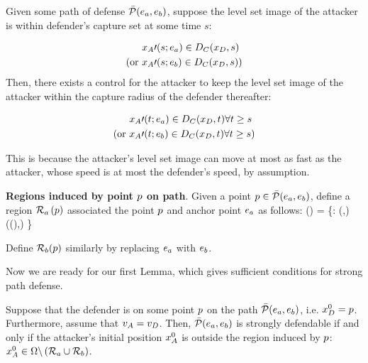 \begin{rem}
Given some path of defense $\bar{\mathcal{P}}(e_a,e_b)$, suppose the level set image of the attacker is within defender's capture set at some time $s$: 

\begin{equation*}
\begin{aligned}
&x_A\prime(s;e_a) \in D_C(x_D, s) \\
\text{(or } & x_A\prime(s;e_b) \in D_C(x_D, s) \text{)}
\end{aligned}
\end{equation*}
Then, there exists a control for the attacker to keep the level set image of the attacker within the capture radius of the defender thereafter: 

\begin{equation*}
\begin{aligned}
&x_A\prime(t;e_a) \in D_C(x_D, t) \forall t\geq s\\
\text{(or } & x_A\prime(t;e_b) \in D_C(x_D, t) \forall t\geq s\text{)}
\end{aligned}
\end{equation*}

This is because the attacker's level set image can move at most as fast as the attacker, whose speed is at most the defender's speed, by assumption.
\end{rem}

\begin{defn} %
\label{def:d_win_region}
\textbf{Regions induced by point $p$ on path}. Given a point $p\in\bar{\mathcal{P}}(e_a,e_b)$, define a region $\mathcal{R}_a\left(p\right)$ associated the point $p$ and anchor point $e_a$ as follows:
\bq
\rpa\left(\ppath\right) = \left\{\x: \dist(\x,\apa) \leq \dist(\Dc(\ppath),\apa) \right\}
\eq

Define $\mathcal{R}_b(p)$ similarly by replacing $e_a$ with $e_b$.
\end{defn}

Now we are ready for our first Lemma, which gives sufficient conditions for strong path defense.
\begin{lem}
\label{lem:d_winning_region}
Suppose that the defender is on some point $p$ on the path $\bar{\mathcal{P}}(e_a,e_b)$, i.e. $x_D^0 = p$. Furthermore, assume that $v_A=v_D$. Then, $\bar{\mathcal{P}}(e_a,e_b)$ is strongly defendable if and only if the attacker's initial position $x_A^0$ is outside the region induced by $p$: $x_A^0\in\Omega\backslash\left(\mathcal{R}_a \cup \mathcal{R}_b\right)$.
\end{lem}

